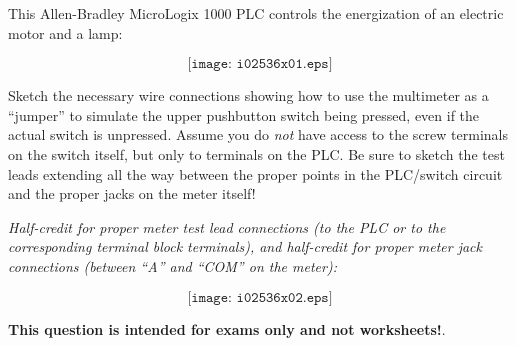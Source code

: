

This Allen-Bradley MicroLogix 1000 PLC controls the energization of an electric motor and a lamp:

$$\texttt{[image: i02536x01.eps]}$$

Sketch the necessary wire connections showing how to use the multimeter as a ``jumper'' to simulate the upper pushbutton switch being pressed, even if the actual switch is unpressed.  Assume you do {\it not} have access to the screw terminals on the switch itself, but only to terminals on the PLC.  Be sure to sketch the test leads extending all the way between the proper points in the PLC/switch circuit and the proper jacks on the meter itself!







{\it Half-credit for proper meter test lead connections (to the PLC or to the corresponding terminal block terminals), and half-credit for proper meter jack connections (between ``A'' and ``COM'' on the meter):}

$$\texttt{[image: i02536x02.eps]}$$







{\bf This question is intended for exams only and not worksheets!}.


